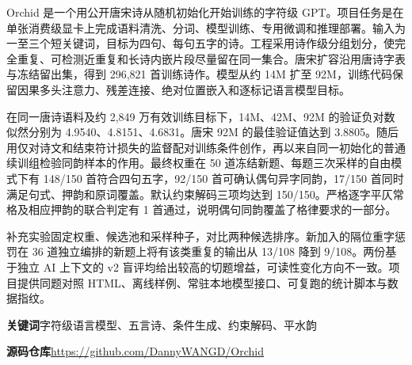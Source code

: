 \documentclass[UTF8,a4paper,11pt,zihao=false,fontset=none]{ctexart}
\begin{document}
Orchid 是一个用公开唐宋诗从随机初始化开始训练的字符级 GPT。项目任务是在单张消费级显卡上完成语料清洗、分词、模型训练、专用微调和推理部署。输入为一至三个短关键词，目标为四句、每句五字的诗。工程采用诗作级分组划分，使完全重复、可检测近重复和长诗内嵌片段尽量留在同一集合。唐宋扩容沿用唐诗字表与冻结留出集，得到 296,821 首训练诗作。模型从约 14M 扩至 92M，训练代码保留因果多头注意力、残差连接、绝对位置嵌入和逐标记语言模型目标。

在同一唐诗语料及约 2,849 万有效训练目标下，14M、42M、92M 的验证负对数似然分别为 4.9540、4.8151、4.6831。唐宋 92M 的最佳验证值达到 3.8805。随后用仅对诗文和结束符计损失的监督配对训练条件创作，再以来自同一初始化的普通续训组检验同韵样本的作用。最终权重在 50 道冻结新题、每题三次采样的自由模式下有 148/150 首符合四句五字，92/150 首可确认偶句异字同韵，17/150 首同时满足句式、押韵和原词覆盖。默认约束解码三项均达到 150/150。严格逐字平仄常格及相应押韵的联合判定有 1 首通过，说明偶句同韵覆盖了格律要求的一部分。

补充实验固定权重、候选池和采样种子，对比两种候选排序。新加入的隔位重字惩罚在 36 道独立编排的新题上将有该类重复的输出从 13/108 降到 9/108。两份基于独立 AI 上下文的 v2 盲评均给出较高的切题增益，可读性变化方向不一致。项目提供同题对照 HTML、离线样例、常驻本地模型接口、可复跑的统计脚本与数据指纹。

\vspace{.45em}
\noindent\textbf{关键词}\quad 字符级语言模型、五言诗、条件生成、约束解码、平水韵\par
\noindent\textbf{源码仓库}\quad \url{https://github.com/DannyWANGD/Orchid}

\clearpage
\begingroup
\small\linespread{1.07}\selectfont
\setlength{\parskip}{0pt}
\tableofcontents
\endgroup
\clearpage
{}






\clearpage
{}
{}
\begingroup
\footnotesize\linespread{1.04}\selectfont\raggedright
\setlength{\parskip}{.17em}


\endgroup
\end{document}
